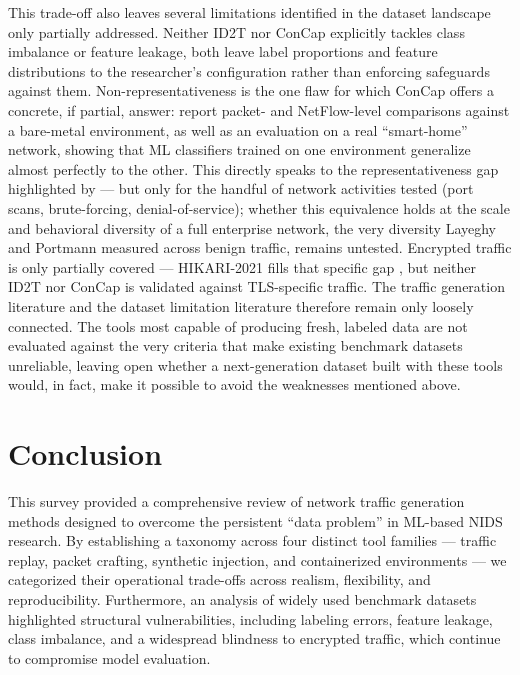 \documentclass[conference]{IEEEtran}
\begin{document}
This trade-off also leaves several limitations identified in the
dataset landscape only partially addressed. Neither ID2T nor ConCap
explicitly tackles class imbalance or feature leakage, both leave
label proportions and feature distributions to the researcher's
configuration rather than enforcing safeguards against them.
Non-representativeness is the one flaw for which ConCap offers a
concrete, if partial, answer: \textcite{concap2026} report packet-
and NetFlow-level comparisons against a bare-metal environment, as
well as an evaluation on a real ``smart-home'' network, showing that
ML classifiers trained on one environment generalize almost perfectly
to the other. This directly speaks to the representativeness gap
highlighted by \textcite{layeghy2022} --- but only for the handful of
network activities tested (port scans, brute-forcing, denial-of-service);
whether this equivalence holds at the scale and behavioral diversity
of a full enterprise network, the very diversity Layeghy and Portmann
measured across benign traffic, remains untested. Encrypted traffic is
only partially covered --- HIKARI-2021 fills that specific gap
\cite{hikari2021}, but neither ID2T nor ConCap is validated against
TLS-specific traffic. The traffic generation literature and the
dataset limitation literature therefore remain only loosely connected.
The tools most capable of producing fresh, labeled data are not
evaluated against the very criteria that make existing benchmark
datasets unreliable, leaving open whether a next-generation dataset
built with these tools would, in fact, make it possible to avoid the weaknesses 
mentioned above.


\section{Conclusion}

This survey provided a comprehensive review of network traffic generation methods 
designed to overcome the persistent ``data problem'' in ML-based NIDS research. 
By establishing a taxonomy across four distinct tool families --- traffic replay, 
packet crafting, synthetic injection, and containerized environments --- we categorized 
their operational trade-offs across realism, flexibility, and reproducibility. 
Furthermore, an analysis of widely used benchmark datasets highlighted structural 
vulnerabilities, including labeling errors, feature leakage, class imbalance, and 
a widespread blindness to encrypted traffic, which continue to compromise model evaluation.
\end{document}
